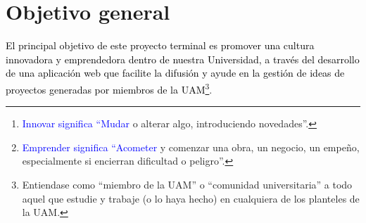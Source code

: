 \documentclass[11pt,letterpaper,titlepage]{article}
\begin{document}
  \begin{abstract}
\textit{Innovar}\footnote{\textcolor{blue}{Innovar significa ``Mudar} o alterar algo, introduciendo novedades''.}\textcolor{blue}{\cite{rae}} y \textit{emprender}\footnote{\textcolor{blue}{Emprender significa ``Acometer} y comenzar una obra, un negocio, un empe\~no, especialmente si encierran dificultad o peligro''.}\textcolor{blue}{\cite{rae}} son verbos que en la actualidad marcan la l\'inea divisoria entre un seguidor y un l\'ider. Para que M\'exico pueda progresar y mantener ese progreso durante un largo tiempo, debe convertirse en un l\'ider, innovando y emprendiendo. Partiendo sobre todo de las que deber\'an de ser sus principales generadoras de talento, conocimiento y soluciones a problemas en nuestra sociedad: sus universidades. 

\textcolor{blue}{Las universidades forman parte de las instituciones sociales, que juegan un papel fundamental en la transformaci\'on de las sociedades\cite{papeluniversidad}.} Cambiemos la forma en que \textcolor{blue}{las vemos}, pensemos en ellas como centros para la convivencia y preparaci\'on de personas que pueden cambiar el rumbo de nuestro pa\'is y del mundo, y no solo como un lugar donde vienen los j\'ovenes a tomar una educaci\'on superior. Preparemos a los j\'ovenes para que sean capaces de tomar liderazgos en un ambiente como en el que M\'exico se encuentra actualmente inmerso. 

La actividad de promover una cultura emprendedora e innovadora que ayude a este prop\'osito, bien puede apoyarse en un sistema inform\'atico.
  \end{abstract}

\section{Objetivo general}
\textcolor{black}{El principal objetivo de este proyecto terminal es promover una cultura innovadora y emprendedora dentro de nuestra Universidad, a trav\'es del desarrollo de una aplicaci\'on web que facilite la difusi\'on y ayude en la gesti\'on de ideas de proyectos generadas por miembros de la UAM}\footnote{Entiendase como ``miembro de la UAM'' o ``comunidad universitaria'' a todo aquel que estudie y trabaje (o lo haya hecho) en cualquiera de los planteles de la UAM.}.
\end{document}
